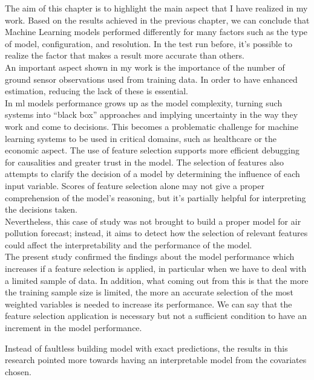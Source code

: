 The aim of this chapter is to highlight the main aspect that I have realized in my work.
Based on the results achieved in the previous chapter, we can conclude that Machine Learning models performed differently for many factors such as the type of model, configuration, and resolution.
In the test run before, it's possible to realize the factor that makes a result more accurate than others.\\
An important aspect shown in my work is the importance of the number of ground sensor observations used from training data. In order to have enhanced estimation, reducing the lack of these is essential.\\
In \acrshort{ml} models performance grows up as the model complexity, turning such systems into “black box” approaches and implying uncertainty in the way they work and come to decisions. 
This becomes a problematic challenge for machine learning systems to be used in critical domains, such as healthcare or the economic aspect.
The use of feature selection supports more efficient debugging for causalities and greater trust in the model.
The selection of features also attempts to clarify the decision of a model by determining the influence of each input variable. 
Scores of feature selection alone may not give a proper comprehension of the model’s reasoning, but it's partially helpful for interpreting the decisions taken.\\
Nevertheless, this case of study was not brought to build a proper model for air pollution forecast; instead, it aims to detect how the selection of relevant features could affect the interpretability and the performance of the model. \\
The present study confirmed the findings about the model performance which increases if a feature selection is applied, in particular when we have to deal with a limited sample of data\cite{vabalas2019machine}. 
In addition, what coming out from this is that the more the training sample size is limited, the more an accurate selection of the most weighted variables is needed to increase its performance.
We can say that the feature selection application is necessary but not a sufficient condition to have an increment in the model performance.
\begin{comment}
In this work, so it is highlighted the effect of how the training in \acrshort{ml} should benefit from an accurate selection of variables. 
\end{comment}
Instead of faultless building model with exact predictions, the results in this research pointed more towards having an interpretable model from the covariates chosen. 
